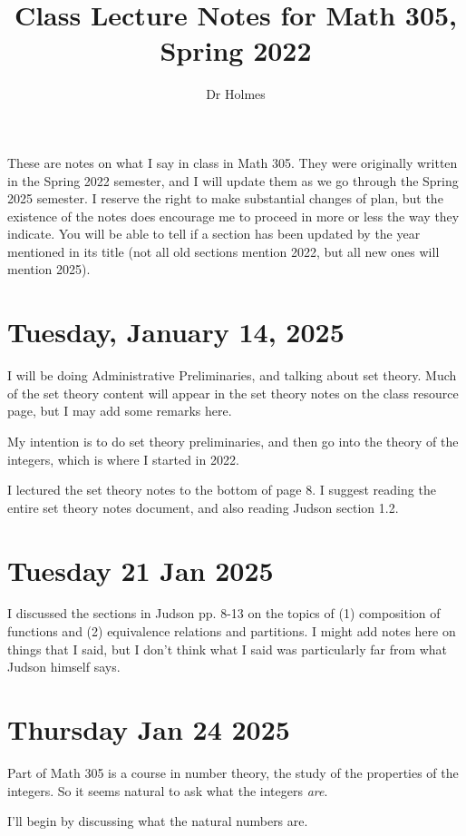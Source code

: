 \documentclass[12pt]{article}
\title{Class Lecture Notes for Math 305, Spring 2022}
\author{Dr Holmes}
\begin{document}
\maketitle

These are notes on what I say in class in Math 305.  They were originally written in the Spring 2022 semester, and I will update them as we go through the Spring 2025 semester.  I reserve the right to make substantial changes of plan, but the existence of the notes does encourage me to proceed in more or less the way they indicate.  You will be able to tell if a section has been updated by the year mentioned in its title (not all old sections mention 2022, but all new ones will mention 2025).

\tableofcontents

\section{Tuesday, January 14, 2025}  I will be doing Administrative Preliminaries, and talking about set theory.  Much of the set theory content will appear in the set theory notes on the class resource page, but I may add some remarks here.

My intention is to do set theory preliminaries, and then go into the theory of the integers, which is where I started in 2022.

I lectured the set theory notes to the bottom of page 8.   I suggest reading the entire set theory notes document, and also reading Judson section 1.2.

\section {Tuesday 21 Jan 2025}  I discussed the sections in Judson pp. 8-13 on the topics of (1) composition of functions
and (2)  equivalence relations and partitions.  I might add notes here on things that I said, but I don't think what I said was particularly far from what Judson himself says.

\newpage

\section{Thursday Jan 24 2025}

Part of Math 305 is a course in number theory, the study of the properties of the integers.  So it seems natural to ask what the integers {\em are\/}.

I'll begin by discussing what the natural numbers are.
\end{document}
